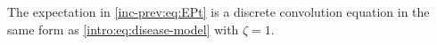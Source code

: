 \documentclass[thesis.tex]{subfiles}
\begin{document}



The expectation in \cref{inc-prev:eq:EPt} is a discrete convolution equation in the same form as \cref{intro:eq:disease-model} with $\zeta = 1$.
\end{document}

